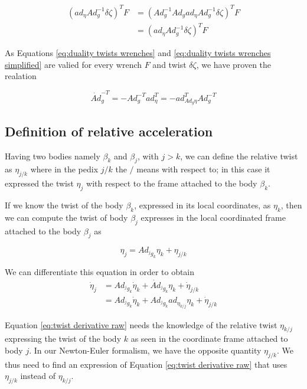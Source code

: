 \documentclass[12pt,a4paper]{book}
\begin{document}
\begin{equation}\label{eq:duality twists wrenches simplified}
\begin{aligned}
	\left(  ad_\eta Ad_g^{-1} \delta \zeta  \right)^T F &= \left( Ad_g^{-1} Ad_g ad_{ \eta} Ad_g ^{-1}\delta \zeta  \right)^T F \\
	&= \left( ad_{ \eta} Ad_g ^{-1}\delta \zeta  \right)^T F
\end{aligned}
\end{equation}

As Equations \eqref{eq:duality twists wrenches} and \eqref{eq:duality twists wrenches simplified} are valied for every wrench $F$ and twist $\delta \zeta$, we have proven the realation

\begin{equation}
	\dot{Ad}_g^{-T} = - Ad_g^{-T} ad_\eta ^T = - ad^T _{Ad_g \eta} Ad_g ^{-T}
\end{equation}


\subsection{Definition of relative acceleration}

Having two bodies namely $\beta_k$ and $\beta_j$, with $j>k$, we can define the relative twist as $\eta_{j/k}$ where in the pedix $j/k$ the $/$ means with respect to; in this case it expressed the twist $\eta_j$ with respect to the frame attached to the body $\beta_k$.

If we know the twist of the body $\beta_k$, expressed in its local coordinates, as $\eta_k$, then we can compute the twist of body $\beta_j$ expresses in the local coordinated frame attached to the body $\beta_j$ as 

\begin{equation}\label{eq: twist definition}
	\eta_j = Ad_{^j g_k} \eta_k + \eta_{j/k}
\end{equation}

We can differentiate this equation in order to obtain 
\begin{equation}\label{eq:twist derivative raw}
\begin{aligned}
	\dot{\eta}_j 	&= Ad_{^jg_k} \dot{\eta}_k + \dot{Ad}_{^jg_k} \eta_k + \dot{\eta}_{j/k} \\
					&= Ad_{^jg_k} \dot{\eta}_k + Ad_{^jg_k} ad_{\eta_{k/j}} \eta_k + \dot{\eta}_{j/k} 
\end{aligned}
\end{equation}

Equation \eqref{eq:twist derivative raw} needs the knowledge of the relative twist $\eta_{k/j}$ expressing the twist of the body $k$ as seen in the coordinate frame attached to body $j$. In our Newton-Euler formalism, we have the opposite quantity $\eta_{j/k}$. We thus need to find an expression of Equation \eqref{eq:twist derivative raw} that uses $\eta_{j/k}$ instead of $\eta_{k/j}$.
\end{document}
